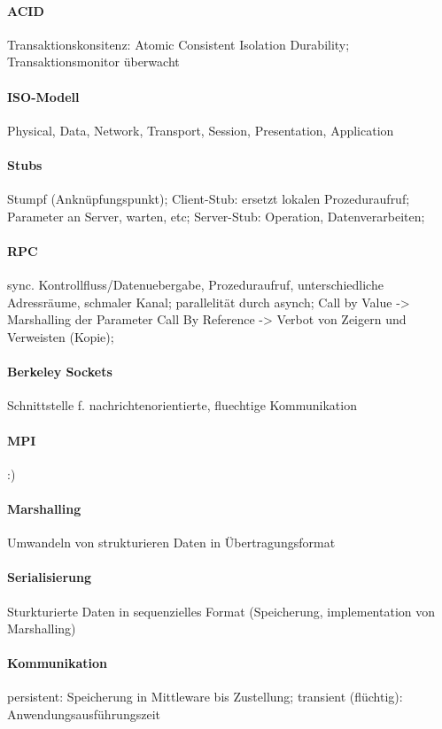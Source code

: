 \documentclass[pagesize,11pt,a4paper]{scrartcl}
\begin{document}
\paragraph*{ACID}
	Transaktionskonsitenz:
		Atomic Consistent Isolation Durability;
	Transaktionsmonitor überwacht

\paragraph*{ISO-Modell}
	Physical, Data, Network, Transport, Session, Presentation, Application
	
\paragraph*{Stubs}
	Stumpf (Anknüpfungspunkt);
	Client-Stub: ersetzt lokalen Prozeduraufruf;
	Parameter an Server, warten, etc;
	Server-Stub: Operation, Datenverarbeiten;

\paragraph*{RPC}
	sync. Kontrollfluss/Datenuebergabe, Prozeduraufruf, unterschiedliche Adressräume, schmaler Kanal;
	parallelität durch asynch;
	Call by Value -> Marshalling der Parameter
	Call By Reference -> Verbot von Zeigern und Verweisten  (Kopie);
	
\paragraph*{Berkeley Sockets}
	Schnittstelle f. nachrichtenorientierte, fluechtige Kommunikation

\paragraph*{MPI}
	:)

\paragraph*{Marshalling}
	Umwandeln von strukturieren Daten in Übertragungsformat
	
\paragraph*{Serialisierung}
	Sturkturierte Daten in sequenzielles Format (Speicherung, implementation von Marshalling)
	
\paragraph*{Kommunikation}
	persistent: Speicherung in Mittleware bis Zustellung;
	transient (flüchtig): Anwendungsausführungszeit
\end{document}
